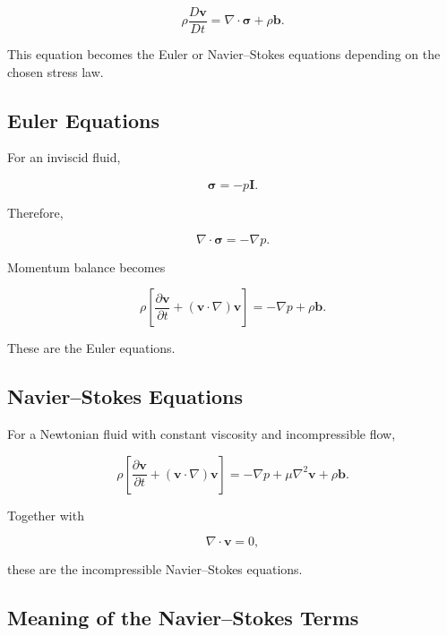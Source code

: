 \[
\boxed{
\rho
\frac{D\mathbf{v}}{Dt}
=
\nabla\cdot\boldsymbol{\sigma}
+
\rho\mathbf{b}.
}
\]

This equation becomes the Euler or Navier--Stokes equations depending on the
chosen stress law.

\subsection{Euler Equations}
\label{subsec:euler-fluid-equations}

For an inviscid fluid,

\[
\boldsymbol{\sigma}
=
-p\mathbf{I}.
\]

Therefore,

\[
\nabla\cdot\boldsymbol{\sigma}
=
-\nabla p.
\]

Momentum balance becomes

\[
\boxed{
\rho
\left[
\frac{\partial\mathbf{v}}{\partial t}
+
(\mathbf{v}\cdot\nabla)\mathbf{v}
\right]
=
-\nabla p
+
\rho\mathbf{b}.
}
\]

These are the Euler equations.

\subsection{Navier--Stokes Equations}
\label{subsec:navier-stokes-equations}

For a Newtonian fluid with constant viscosity and incompressible flow,

\[
\boxed{
\rho
\left[
\frac{\partial\mathbf{v}}{\partial t}
+
(\mathbf{v}\cdot\nabla)\mathbf{v}
\right]
=
-\nabla p
+
\mu\nabla^2\mathbf{v}
+
\rho\mathbf{b}.
}
\]

Together with

\[
\boxed{
\nabla\cdot\mathbf{v}=0,
}
\]

these are the incompressible Navier--Stokes equations.

\subsection{Meaning of the Navier--Stokes Terms}
\label{subsec:navier-stokes-term-meaning}

